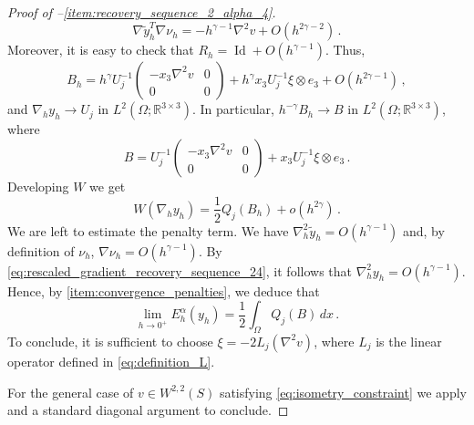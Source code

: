 \documentclass{article}
\theoremstyle{plain}
\theoremstyle{plain}
\theoremstyle{plain}
\theoremstyle{plain}
\theoremstyle{plain}
\theoremstyle{definition}
\theoremstyle{definition}
\renewcommand{\r}{\mathbb{R}}
\DeclareMathOperator{\Id}{Id}
\begin{document}
\begin{proof}[Proof of --\ref{item:recovery_sequence_2_alpha_4}]
    \[
        \nabla \tilde y_h^T  \nabla \nu_h = -h^{\gamma - 1} \nabla^2 v + O(h^{2\gamma-2}) \,.
    \]
    Moreover, it is easy to check that $R_h = \Id + O(h^{\gamma-1})$. Thus, 
    \[
        B_h = h^\gamma U_j^{-1}\begin{pmatrix}
            -x_3 \nabla^2 v & 0 \\
            0 & 0
        \end{pmatrix} + h^{\gamma} x_3 U_j^{-1} \xi \otimes e_3 +O(h^{2\gamma - 1}) \,,
    \]
    and $\nabla_h y_h \to U_j$ in $L^2(\Omega; \r^{3 \times 3})$. In particular, $h^{-\gamma}B_h \to B$ in $L^2(\Omega; \r^{3 \times 3})$, where
    \[
        B = U_j^{-1}\begin{pmatrix}
            - x_3 \nabla^2 v & 0 \\
            0 & 0
        \end{pmatrix} + x_3 U_j^{-1} \xi \otimes e_3 \,.
    \]
    Developing $W$ we get
    \[
        W(\nabla_h y_h) = \dfrac{1}{2}Q_j(B_h) + o(h^{2\gamma}) \,.
    \]
    We are left to estimate the penalty term. 
    We have $\nabla_h^2 \tilde y_h = O(h^{\gamma - 1})$ and, by definition of $\nu_h$, $\nabla \nu_h = O(h^{\gamma - 1})$.
    By \eqref{eq:rescaled_gradient_recovery_sequence_24}, it follows that $\nabla^2_h y_h = O(h^{\gamma - 1})$.
    Hence, by \ref{item:convergence_penalties}, we deduce that
    \[
        \lim_{h \to 0^+} E_h^\alpha(y_h) = \dfrac{1}{2}\int_\Omega Q_j(B) \, dx \,.
    \]
    To conclude, it is sufficient to choose $\xi = -2L_j(\nabla^2 v)$, where $L_j$ is the linear operator defined in \eqref{eq:definition_L}. 
    
    For the general case of $v \in W^{2,2}(S)$ satisfying \eqref{eq:isometry_constraint} we apply  and a standard diagonal argument to conclude. 
\end{proof}
\end{document}

